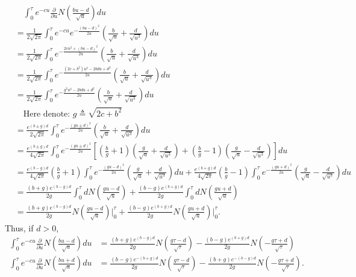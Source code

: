\documentclass[paper=a4, fontsize=11pt]{scrartcl} %
\numberwithin{equation}{section} %
\numberwithin{figure}{section} %
\numberwithin{table}{section} %
\begin{document}
\begin{align}
\nonumber  &\quad\int_0^{\tau}e^{-c u}\frac{\partial}{\partial u} N\left( \frac{bu- d }{\sqrt{u}} \right) du\\
\nonumber 
&=   \frac{1}{2\sqrt{2\pi}}\int_0^{\tau}e^{-c u}e^{-\frac{(bu-  d)^2}{2u}} \left( \frac{b}{\sqrt{u}}+ \frac{d}{\sqrt{u^3}} \right)du \\
\nonumber &=\frac{1}{2\sqrt{2\pi}}\int_0^{\tau}e^{-\frac{2cu^2+(bu- d)^2}{2u}} \left( \frac{b}{\sqrt{u}}+ \frac{d}{\sqrt{u^3}} \right)du \\
\nonumber &=\frac{1}{2\sqrt{2\pi}}\int_0^{\tau}e^{-\frac{\left(2c+b^2\right)u^2- 2bd u + d^2}{2u}} \left( \frac{b}{\sqrt{u}}+ \frac{d}{\sqrt{u^3}} \right)du \\
\nonumber &=\frac{1}{2\sqrt{2\pi}}\int_0^{\tau}e^{-\frac{g^2 u^2- 2bd u + d^2}{2u}} \left( \frac{b}{\sqrt{u}}+ \frac{d}{\sqrt{u^3}} \right)du\\
\nonumber &\quad \text{Here denote: }  g\triangleq \sqrt{2c+b^2}\\
\nonumber &=\frac{e^{ (b\pm g)d}}{2\sqrt{2\pi}}\int_0^{\tau}e^{-\frac{\left(gu \pm d\right)^2 }{2u}} \left( \frac{b}{\sqrt{u}}+ \frac{d}{\sqrt{u^3}} \right)du \\
\nonumber &=\frac{e^{ (b\pm g)d}}{4\sqrt{2\pi}}\int_0^{\tau}e^{-\frac{\left(gu \pm d\right)^2 }{2u}} \left[     
\left( \frac{b}{g}+1 \right)  \left(\frac{g}{\sqrt{u}}+ \frac{d}{\sqrt{u^3}} \right)
+ \left( \frac{b}{g}-1 \right)  \left(\frac{g}{\sqrt{u}}- \frac{d}{\sqrt{u^3}} \right) \right]du \\
\nonumber &=\frac{e^{ (b- g)d}}{4\sqrt{2\pi}}\left( \frac{b}{g}+1 \right) \int_0^{\tau}e^{-\frac{\left(gu - d\right)^2 }{2u}}   
 \left(\frac{g}{\sqrt{u}}+ \frac{d}{\sqrt{u^3}} \right) du + \frac{e^{ (b+g)d}}{4\sqrt{2\pi}}\left( \frac{b}{g} - 1 \right) \int_0^{\tau}e^{-\frac{\left(gu+ d\right)^2 }{2u}}   
 \left(\frac{g}{\sqrt{u}}- \frac{d}{\sqrt{u^3}} \right) du \\
 \nonumber &=\frac{(b+g)e^{ (b- g)d}}{2g} \int_0^{\tau} dN\left(  \frac{gu-d}{\sqrt{u}}\right) + \frac{(b-g)e^{ (b+g)d}}{2g} \int_0^{\tau} d N\left(  \frac{gu+d}{\sqrt{u}}\right)\\
 \nonumber &=\frac{(b+g)e^{ (b- g)d}}{2g} N\left(  \frac{gu-d}{\sqrt{u}}\right)\Bigg|_{0}^{\tau} + \frac{(b-g)e^{ (b+g)d}}{2g} N\left(  \frac{gu+d}{\sqrt{u}}\right)\Bigg|_{0}^{\tau}.
\end{align}
Thus, if $d>0$,
\begin{align}
\nonumber \int_0^{\tau}e^{-c u}\frac{\partial}{\partial u} N\left( \frac{bu- d }{\sqrt{u}} \right) du
&= \frac{(b+g)e^{ (b- g)d}}{2g} N\left(  \frac{g\tau-d}{\sqrt{\tau}}\right) - \frac{(b-g)e^{ (b+g)d}}{2g} N\left(  -\frac{g\tau+d}{\sqrt{\tau}}\right)\\
\nonumber\int_0^{\tau}e^{-c u}\frac{\partial}{\partial u} N\left( \frac{bu+ d }{\sqrt{u}} \right) du
&= \frac{(b-g)e^{ -(b+ g)d}}{2g} N\left( \frac{g\tau-d}{\sqrt{\tau}}\right)-\frac{(b+g)e^{ -(b- g)d}}{2g} N\left(  -\frac{g\tau+d}{\sqrt{\tau}}\right) .
\end{align}
\end{document}
